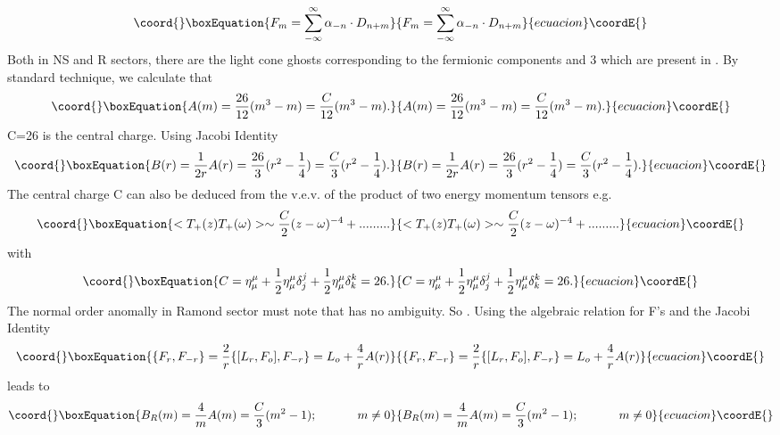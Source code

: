 \documentclass[a4paper,showpacs,preprintnumbers,amsmath,amssymb]{revtex4}
\begin{document}
\begin{equation}\coord{}\boxEquation{
F_m= \sum^{\infty}_{-\infty}\alpha_{-n}\cdot D_{n+m}
}{
F_m= \sum^{\infty}_{-\infty}\alpha_{-n}\cdot D_{n+m}
}{ecuacion}\coordE{}\end{equation}
Both in NS and R sectors, there are the light cone ghosts corresponding to the 
fermionic components \coordHE{} and 3 which are present in \coordHE{}.
By standard technique, we calculate that
\begin{equation}\coord{}\boxEquation{
A(m)=\frac{26}{12}(m^3-m)=\frac{C}{12}(m^3-m).
}{
A(m)=\frac{26}{12}(m^3-m)=\frac{C}{12}(m^3-m).
}{ecuacion}\coordE{}\end{equation}
C=26 is the central charge. Using Jacobi Identity
\begin{equation}\coord{}\boxEquation{
B(r)=\frac{1}{2r}A(r)=\frac{26}{3}(r^2-\frac{1}{4})=\frac{C}{3}(r^2-\frac{1}{4}).
}{
B(r)=\frac{1}{2r}A(r)=\frac{26}{3}(r^2-\frac{1}{4})=\frac{C}{3}(r^2-\frac{1}{4}).
}{ecuacion}\coordE{}\end{equation}
The central charge C can also be deduced from the v.e.v. of the product of two energy
momentum tensors e.g.
\begin{equation}\coord{}\boxEquation{
< T_+(z)T_+(\omega)>\sim \frac{C}{2}(z-\omega)^{-4}+.........
}{
< T_+(z)T_+(\omega)>\sim \frac{C}{2}(z-\omega)^{-4}+.........
}{ecuacion}\coordE{}\end{equation}
with
\begin{equation}\coord{}\boxEquation{
C=\eta^{\mu}_{\mu}+\frac{1}{2}\eta^{\mu}_{\mu}\delta^j_j +
\frac{1}{2}\eta^{\mu}_{\mu}\delta^k_k=26.
}{
C=\eta^{\mu}_{\mu}+\frac{1}{2}\eta^{\mu}_{\mu}\delta^j_j +
\frac{1}{2}\eta^{\mu}_{\mu}\delta^k_k=26.
}{ecuacion}\coordE{}\end{equation} 
The normal order anomally in Ramond sector must note that \coordHE{} has no ambiguity. 
So \coordHE{}. Using the algebraic relation for F's and the Jacobi Identity
\begin{equation}\coord{}\boxEquation{
\{ F_r , F_{-r}\} = \frac{2}{r}\{ [L_r ,F_o], F_{-r}\} =L_o + \frac{4}{r} A(r)
}{
\{ F_r , F_{-r}\} = \frac{2}{r}\{ [L_r ,F_o], F_{-r}\} =L_o + \frac{4}{r} A(r)
}{ecuacion}\coordE{}\end{equation} 
leads to
\begin{equation}\coord{}\boxEquation{
 B_R(m)=\frac{4}{m} A(m)=\frac{C}{3}(m^2 - 1);~~~~~~~~~~ m\neq 0
}{
 B_R(m)=\frac{4}{m} A(m)=\frac{C}{3}(m^2 - 1);~~~~~~~~~~ m\neq 0
}{ecuacion}\coordE{}\end{equation}
\end{document}
